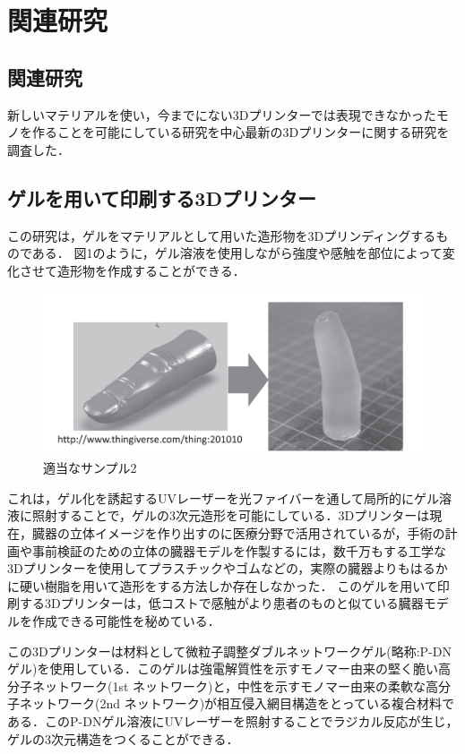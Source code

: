 \chapter{関連研究}
\label{chp:first}

\section{関連研究}
\label{sec:paragraph}

新しいマテリアルを使い，今までにない3Dプリンターでは表現できなかったモノを作ることを可能にしている研究を中心最新の3Dプリンターに関する研究を調査した．


\section{ゲルを用いて印刷する3Dプリンター}
\label{sec:enum}

この研究は，ゲルをマテリアルとして用いた造形物を3Dプリンディングするものである．
図1のように，ゲル溶液を使用しながら強度や感触を部位によって変化させて造形物を作成することができる．

\begin{figure}[H]
  \centering
  \includegraphics[width=6.4truecm]{./fig/ゲルを用いて印刷する3Dプリンター.png}
  \caption{適当なサンプル2}
  \label{fig:ferret}
\end{figure}

これは，ゲル化を誘起するUVレーザーを光ファイバーを通して局所的にゲル溶液に照射することで，ゲルの3次元造形を可能にしている．3Dプリンターは現在，臓器の立体イメージを作り出すのに医療分野で活用されているが，手術の計画や事前検証のための立体の臓器モデルを作製するには，数千万もする工学な3Dプリンターを使用してプラスチックやゴムなどの，実際の臓器よりもはるかに硬い樹脂を用いて造形をする方法しか存在しなかった．
このゲルを用いて印刷する3Dプリンターは，低コストで感触がより患者のものと似ている臓器モデルを作成できる可能性を秘めている．

この3Dプリンターは材料として微粒子調整ダブルネットワークゲル(略称:P-DNゲル)を使用している．このゲルは強電解質性を示すモノマー由来の堅く脆い高分子ネットワーク(1st ネットワーク)と，中性を示すモノマー由来の柔軟な高分子ネットワーク(2nd ネットワーク)が相互侵入網目構造をとっている複合材料である．このP-DNゲル溶液にUVレーザーを照射することでラジカル反応が生じ，ゲルの3次元構造をつくることができる．
